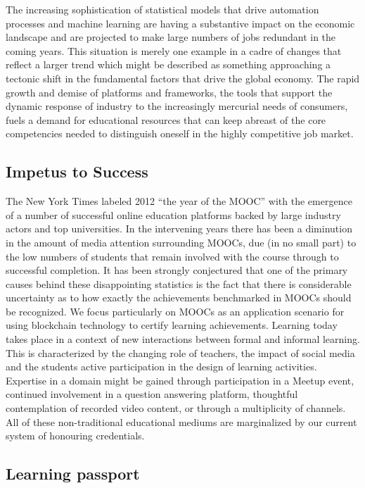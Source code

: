 The increasing sophistication of statistical models that drive automation processes and machine learning are having a substantive impact on the economic landscape and are projected to make large numbers of jobs redundant in the coming years. 
This situation is merely one example in a cadre of changes that reflect a larger trend which might be described as something approaching a tectonic shift in the fundamental factors that drive the global economy. 
The rapid growth and demise of platforms and frameworks, the tools that support the dynamic response of industry to the increasingly mercurial needs of consumers, fuels a demand for educational resources that can keep abreast of the core competencies needed to distinguish oneself in the highly competitive job market.

\subsection{Impetus to Success}

The New York Times labeled 2012 ``the year of the MOOC'' \cite{laurapappano2012} with the emergence of a number of successful online education platforms backed by large industry actors and top universities.
In the intervening years there has been a diminution in the amount of media attention surrounding MOOCs, due (in no small part) to the low numbers of students that remain involved with the course through to successful completion. 
It has been strongly conjectured that one of the primary causes behind these disappointing statistics is the fact that there is considerable uncertainty as to how exactly the achievements benchmarked in MOOCs should be recognized. 
We focus particularly on MOOCs as an application scenario for using blockchain technology to certify learning achievements.
Learning today takes place in a context of new interactions between formal and informal learning. 
This is characterized by the changing role of teachers, the impact of social media and the students active participation in the design of learning activities.
Expertise in a domain might be gained through participation in a Meetup event, continued involvement in a question answering platform, thoughtful contemplation of recorded video content, or through a multiplicity of channels. 
All of these non-traditional educational mediums are marginalized by our current system of honouring credentials.

\subsection{Learning passport}

